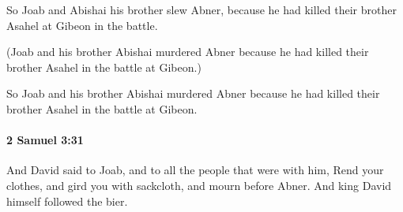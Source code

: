 			\begin{versebox}
					\item[BHS] 
					\item[ASV] So Joab and Abishai his brother slew Abner, because he had killed their brother Asahel at Gibeon in the battle.
					\item[NIV] (Joab and his brother Abishai murdered Abner because he had killed their brother Asahel in the battle at Gibeon.)
					\item[NRSV] So Joab and his brother Abishai murdered Abner because he had killed their brother Asahel in the battle at Gibeon.
			\end{versebox}

		\paragraph{2 Samuel 3:31} %
			\label{2SAMUEL-3-31}

			And David said to Joab, and to all the people that were with him, Rend your clothes, and gird you with sackcloth, and mourn before Abner. And king David himself followed the bier.

